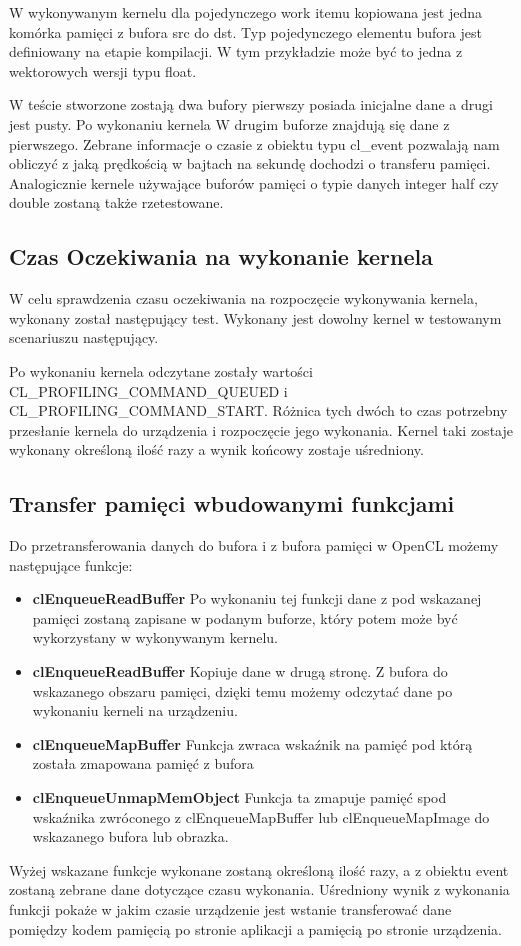 
 
W wykonywanym kernelu dla pojedynczego work itemu kopiowana jest jedna komórka pamięci z bufora src do dst. Typ pojedynczego elementu bufora jest definiowany na etapie kompilacji. W tym przykładzie może być to jedna z wektorowych wersji typu float.

W teście stworzone zostają dwa bufory pierwszy posiada inicjalne dane a drugi jest pusty. Po wykonaniu kernela W drugim buforze znajdują się dane z pierwszego. Zebrane informacje o czasie z obiektu typu cl\_event pozwalają nam obliczyć z jaką prędkością w bajtach na sekundę dochodzi o transferu pamięci.
Analogicznie kernele używające buforów pamięci o typie danych integer half czy double zostaną także rzetestowane.

\subsection[Czas Oczekiwania na wykonanie kernela]{Czas Oczekiwania na wykonanie kernela}
W celu sprawdzenia czasu oczekiwania na rozpoczęcie wykonywania kernela, wykonany został następujący test. Wykonany jest dowolny kernel w testowanym scenariuszu następujący.



Po wykonaniu kernela odczytane zostały wartości CL\_PROFILING\_COMMAND\_QUEUED i CL\_PROFILING\_COMMAND\_START. Różnica tych dwóch to czas potrzebny przesłanie kernela do urządzenia i rozpoczęcie jego wykonania. Kernel taki zostaje wykonany określoną ilość razy a wynik końcowy zostaje uśredniony.
\subsection[Transfer pamięci wbudowanymi funkcjami]{Transfer pamięci wbudowanymi funkcjami}
Do przetransferowania danych do bufora i z bufora pamięci w OpenCL możemy następujące funkcje:
 \begin{itemize}
	\item \textbf{clEnqueueReadBuffer} Po wykonaniu tej funkcji dane z pod wskazanej pamięci zostaną zapisane w podanym buforze, który potem może być wykorzystany w wykonywanym kernelu.
	\item \textbf{clEnqueueReadBuffer} Kopiuje dane w drugą stronę. Z bufora do wskazanego obszaru pamięci, dzięki temu możemy odczytać dane po wykonaniu kerneli na urządzeniu.
	\item \textbf{clEnqueueMapBuffer} Funkcja zwraca wskaźnik na pamięć pod którą została zmapowana pamięć z bufora
	\item \textbf{clEnqueueUnmapMemObject} Funkcja ta zmapuje pamięć spod wskaźnika zwróconego z clEnqueueMapBuffer lub clEnqueueMapImage do wskazanego bufora lub obrazka.
\end{itemize}
Wyżej wskazane funkcje wykonane zostaną określoną ilość razy, a z obiektu event zostaną zebrane dane dotyczące czasu wykonania. Uśredniony wynik z wykonania funkcji pokaże w jakim czasie urządzenie jest wstanie transferować dane pomiędzy kodem pamięcią po stronie aplikacji a pamięcią po stronie urządzenia.
